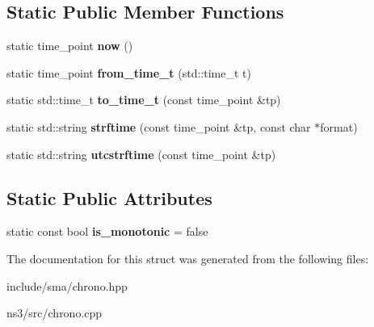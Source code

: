\subsection*{Static Public Member Functions}
\begin{DoxyCompactItemize}
\item 
\hypertarget{structsma_1_1chrono_1_1system__clock_a9a9ba92fbde245c37033b206bc3997a7}{static time\-\_\-point {\bfseries now} ()}\label{structsma_1_1chrono_1_1system__clock_a9a9ba92fbde245c37033b206bc3997a7}

\item 
\hypertarget{structsma_1_1chrono_1_1system__clock_ad740c4d93bc74837b31ab4c98dc02086}{static time\-\_\-point {\bfseries from\-\_\-time\-\_\-t} (std\-::time\-\_\-t t)}\label{structsma_1_1chrono_1_1system__clock_ad740c4d93bc74837b31ab4c98dc02086}

\item 
\hypertarget{structsma_1_1chrono_1_1system__clock_afe3e74add4a9f9d3d938eb68eb80c759}{static std\-::time\-\_\-t {\bfseries to\-\_\-time\-\_\-t} (const time\-\_\-point \&tp)}\label{structsma_1_1chrono_1_1system__clock_afe3e74add4a9f9d3d938eb68eb80c759}

\item 
\hypertarget{structsma_1_1chrono_1_1system__clock_aedd7f428b0b872aea75729e887100444}{static std\-::string {\bfseries strftime} (const time\-\_\-point \&tp, const char $\ast$format)}\label{structsma_1_1chrono_1_1system__clock_aedd7f428b0b872aea75729e887100444}

\item 
\hypertarget{structsma_1_1chrono_1_1system__clock_a05877b6bac2d65830e3adac4f33907fa}{static std\-::string {\bfseries utcstrftime} (const time\-\_\-point \&tp)}\label{structsma_1_1chrono_1_1system__clock_a05877b6bac2d65830e3adac4f33907fa}

\end{DoxyCompactItemize}
\subsection*{Static Public Attributes}
\begin{DoxyCompactItemize}
\item 
\hypertarget{structsma_1_1chrono_1_1system__clock_a4a8b6c7f7fca9066512ba099a68b8b84}{static const bool {\bfseries is\-\_\-monotonic} = false}\label{structsma_1_1chrono_1_1system__clock_a4a8b6c7f7fca9066512ba099a68b8b84}

\end{DoxyCompactItemize}


The documentation for this struct was generated from the following files\-:\begin{DoxyCompactItemize}
\item 
include/sma/chrono.\-hpp\item 
ns3/src/chrono.\-cpp\end{DoxyCompactItemize}
